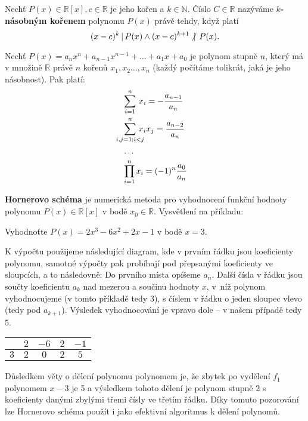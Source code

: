 \begin{definition}
  Nechť $P(x) \in \mathbb R [x], c \in \mathbb R$ je jeho kořen a $k \in \mathbb N$. Číslo $C \in \mathbb R$ nazýváme \textbf{$k$-násobným kořenem} polynomu $P(x)$ právě tehdy, když platí
  \[
    (x-c)^k \, | \, P(x) \land (x-c)^{k+1} \,\centernot |\,  P(x).
  \]
\end{definition}

\begin{veta}
  Nechť $P(x)=a_nx^n+a_{n-1}x^{n-1}+\dots + a_1x+a_0$ je polynom stupně $n$, který má v množině $\mathbb R$ právě $n$ kořenů $x_1,x_2\dots,x_n$ (každý počítáme tolikrát, jaká je jeho násobnost). Pak platí:
  \begin{align*}
    &\smashoperator[l]{\sum_{i=1}^n} \, x_i = -\frac{a_{n-1}}{a_n} \\
    &\smashoperator[l]{\sum_{i,j=1; i<j}^{n}}\!\!\!\!\! x_ix_j= \frac{a_{n-2}}{a_n} \\
    & \hdots \\
    &\smashoperator[l]{\prod_{i=1}^n}x_i=(-1)^n\frac{a_0}{a_n}
  \end{align*}
\end{veta}

\begin{pozn}
  \textbf{Hornerovo schéma} je numerická metoda pro vyhodnocení funkční hodnoty polynomu $P(x) \in \mathbb R [x]$ v bodě $ x_0 \in \mathbb R$. Vysvětlení na příkladu:
  \begin{center}
  Vyhodnoťte $P(x)=2x^{3}-6x^{2}+2x-1$ v bodě $x=3$.
  \end{center}
  K výpočtu použijeme následující diagram, kde v prvním řádku jsou koeficienty polynomu, samotné výpočty pak probíhají pod přepsanými koeficienty ve sloupcích, a to následovně:
  Do prvního místa opíšeme $a_n$. Další čísla v řádku jsou součty koeficientu $a_k$ nad mezerou a součinu hodnoty $x$, v~níž polynom vyhodnocujeme (v tomto příkladě tedy $3$), s číslem v řádku o jeden sloupec vlevo (tedy pod $a_{k+1}$). Výsledek vyhodnocování je vpravo dole – v našem případě tedy $5$.
  \begin{center}
    \begin{tabular}{ c|c c c c }
        $ $ & $2$ & $-6$ & $2$ & $-1$\\
        \hline
        $3$ & $2$ & $0$ & $2$ & $5$
    \end{tabular}
  \end{center}
  Důsledkem věty o dělení polynomu polynomem je, že zbytek po vydělení $f_1$ polynomem $x-3$ je 5 a výsledkem tohoto dělení je polynom stupně 2 s koeficienty danými zbylými třemi čísly ve třetím řádku. Díky tomuto pozorování lze Hornerovo schéma použít i jako efektivní algoritmus k dělení polynomů.
\end{pozn}

